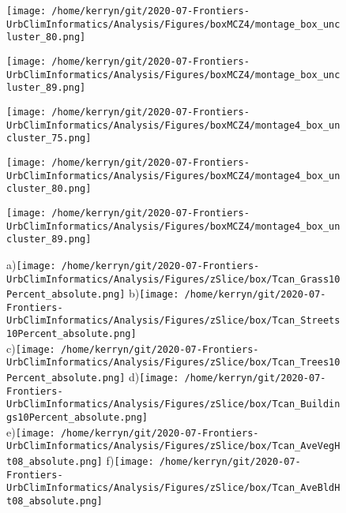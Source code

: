 \documentclass{article}
\begin{document}
\begin{figure}
\centering    
\texttt{[image: /home/kerryn/git/2020-07-Frontiers-UrbClimInformatics/Analysis/Figures/boxMCZ4/montage\_box\_uncluster\_80.png]}
\end{figure} 
\clearpage


\begin{figure}
\centering    
\texttt{[image: /home/kerryn/git/2020-07-Frontiers-UrbClimInformatics/Analysis/Figures/boxMCZ4/montage\_box\_uncluster\_89.png]}
\end{figure} 
\clearpage





\begin{figure}
\centering    
\texttt{[image: /home/kerryn/git/2020-07-Frontiers-UrbClimInformatics/Analysis/Figures/boxMCZ4/montage4\_box\_uncluster\_75.png]}
\end{figure} 
\clearpage

\begin{figure}
\centering    
\texttt{[image: /home/kerryn/git/2020-07-Frontiers-UrbClimInformatics/Analysis/Figures/boxMCZ4/montage4\_box\_uncluster\_80.png]}
\end{figure} 
\clearpage


\begin{figure}
\centering    
\texttt{[image: /home/kerryn/git/2020-07-Frontiers-UrbClimInformatics/Analysis/Figures/boxMCZ4/montage4\_box\_uncluster\_89.png]}
\end{figure} 
\clearpage







\begin{figure}
\centering    
{\tiny a)}\texttt{[image: /home/kerryn/git/2020-07-Frontiers-UrbClimInformatics/Analysis/Figures/zSlice/box/Tcan\_Grass10Percent\_absolute.png]}
{\tiny b)}\texttt{[image: /home/kerryn/git/2020-07-Frontiers-UrbClimInformatics/Analysis/Figures/zSlice/box/Tcan\_Streets10Percent\_absolute.png]}\\
{\tiny c)}\texttt{[image: /home/kerryn/git/2020-07-Frontiers-UrbClimInformatics/Analysis/Figures/zSlice/box/Tcan\_Trees10Percent\_absolute.png]}
{\tiny d)}\texttt{[image: /home/kerryn/git/2020-07-Frontiers-UrbClimInformatics/Analysis/Figures/zSlice/box/Tcan\_Buildings10Percent\_absolute.png]}\\
{\tiny e)}\texttt{[image: /home/kerryn/git/2020-07-Frontiers-UrbClimInformatics/Analysis/Figures/zSlice/box/Tcan\_AveVegHt08\_absolute.png]}
{\tiny f)}\texttt{[image: /home/kerryn/git/2020-07-Frontiers-UrbClimInformatics/Analysis/Figures/zSlice/box/Tcan\_AveBldHt08\_absolute.png]}
\end{figure} 
\clearpage
\end{document}
